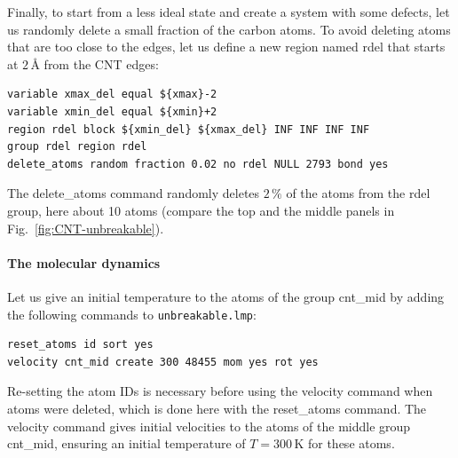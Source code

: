 \documentclass[9pt,tutorial]{livecoms}
\newcommand{\lmpcmd}[1]{\hspace{0pt}\colorbox{listing}{\textcolor{command}{\small{#1}}}\hspace{0pt}} %
\newcommand{\flecmd}[1]{\textcolor{command}{\texttt{#1}}} %
\begin{document}
Finally, to start from a less ideal state and create a system with some defects,
let us randomly delete a small fraction of the carbon atoms.  To avoid deleting
atoms that are too close to the edges, let us define a new region named \lmpcmd{rdel}
that starts at $2\,\text{\AA{}}$ from the CNT edges:
\begin{lstlisting}
variable xmax_del equal ${xmax}-2
variable xmin_del equal ${xmin}+2
region rdel block ${xmin_del} ${xmax_del} INF INF INF INF
group rdel region rdel
delete_atoms random fraction 0.02 no rdel NULL 2793 bond yes
\end{lstlisting}
The \lmpcmd{delete\_atoms} command randomly deletes $2\,\%$ of the atoms from
the \lmpcmd{rdel} group, here about 10 atoms (compare the top
and the middle panels in Fig.~\ref{fig:CNT-unbreakable}).

\paragraph{The molecular dynamics}

Let us give an initial temperature to the atoms of the group \lmpcmd{cnt\_mid}
by adding the following commands to \flecmd{unbreakable.lmp}:
\begin{lstlisting}
reset_atoms id sort yes
velocity cnt_mid create 300 48455 mom yes rot yes
\end{lstlisting}
Re-setting the atom IDs is necessary before using the \lmpcmd{velocity} command
when atoms were deleted, which is done here with the \lmpcmd{reset\_atoms} command.
The \lmpcmd{velocity} command gives initial velocities to the atoms of the middle
group \lmpcmd{cnt\_mid}, ensuring an initial temperature of $T = 300\,\text{K}$
for these atoms.
\end{document}
